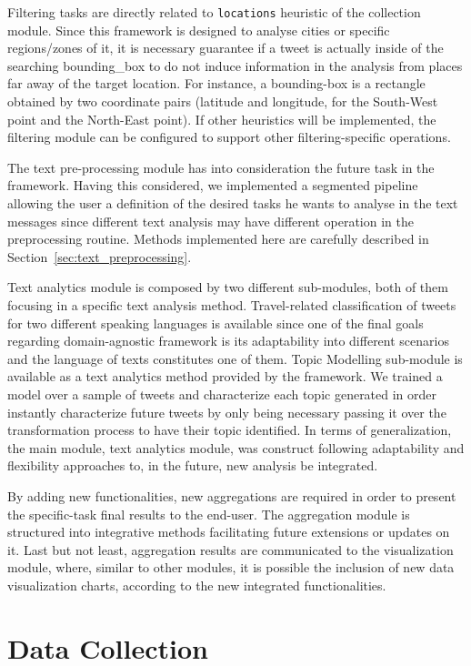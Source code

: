 Filtering tasks are directly related to \texttt{locations} heuristic of the collection module. Since this framework is designed to analyse cities or specific regions/zones of it, it is necessary guarantee if a tweet is actually inside of the searching \gls{bounding_box} to do not induce information in the analysis from places far away of the target location. For instance, a bounding-box is a rectangle obtained by two coordinate pairs (latitude and longitude, for the South-West point and the North-East point). If other heuristics will be implemented, the filtering module can be configured to support other filtering-specific operations.

The text pre-processing module has into consideration the future task in the framework. Having this considered, we implemented a segmented pipeline allowing the user a definition of the desired tasks he wants to analyse in the text messages since different text analysis may have different operation in the preprocessing routine. Methods implemented here are carefully described in Section~\ref{sec:text_preprocessing}.

Text analytics module is composed by two different sub-modules, both of them focusing in a specific text analysis method. Travel-related classification of tweets for two different speaking languages is available since one of the final goals regarding domain-agnostic framework is its adaptability into different scenarios and the language of texts constitutes one of them. Topic Modelling sub-module is available as a text analytics method provided by the framework. We trained a model over a sample of tweets and characterize each topic generated in order instantly characterize future tweets by only being necessary passing it over the transformation process to have their topic identified.
In terms of generalization, the main module, text analytics module, was construct following adaptability and flexibility approaches to, in the future, new analysis be integrated.

By adding new functionalities, new aggregations are required in order to present the specific-task final results to the end-user. The aggregation module is structured into integrative methods facilitating future extensions or updates on it. Last but not least, aggregation results are communicated to the visualization module, where, similar to other modules, it is possible the inclusion of new data visualization charts, according to the new integrated functionalities.

\section{Data Collection}\label{sec:data_collection}

